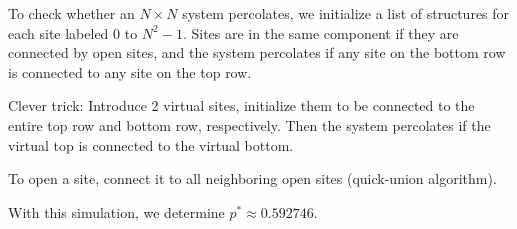\documentclass[11pt]{article}
\begin{document}
		To check whether an $N\times N$ system percolates, we initialize a list of structures for each site labeled $0$ to $N^2 - 1$. Sites are in the same component if they are connected by open sites, and the system percolates if any site on the bottom row is connected to any site on the top row.	
		
		Clever trick: Introduce 2 virtual sites, initialize them to be connected to the entire top row and bottom row, respectively. Then the system percolates if the virtual top is connected to the virtual bottom.
		
		To open a site, connect it to all neighboring open sites (quick-union algorithm).
		
		With this simulation, we determine $p^* \approx 0.592746$.
\end{document}
